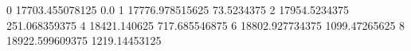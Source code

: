0 17703.455078125 0.0
1 17776.978515625 73.5234375
2 17954.5234375 251.068359375
4 18421.140625 717.685546875
6 18802.927734375 1099.47265625
8 18922.599609375 1219.14453125
